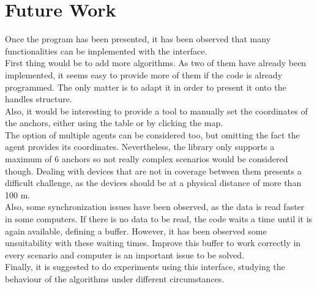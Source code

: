 \documentclass[a4paper, 21pt]{article} %
\begin{document}
\section{Future Work}
Once the program has been presented, it has been observed that many functionalities can be implemented with the interface.\\

First thing would be to add more algorithms. As two of them have already been implemented, it seems easy to provide more of them if the code is already programmed. The only matter is to adapt it in order to present it onto the handles structure.\\

Also, it would be interesting to provide a tool to manually set the coordinates of the anchors, either using the table or by clicking the map.\\

The option of multiple agents can be considered too, but omitting the fact the agent provides its coordinates. Nevertheless, the library only supports a maximum of 6 anchors so not really complex scenarios would be considered though. Dealing with devices that are not in coverage between them presents a difficult challenge, as the devices should be at a physical distance of more than 100 m.\\

Also, some synchronization issues have been observed, as the data is read faster in some computers. If there is no data to be read, the code waits a time until it is again available, defining a buffer. However, it has been observed some unsuitability with these waiting times. Improve this buffer to work correctly in every scenario and computer is an important issue to be solved.\\

Finally, it is suggested to do experiments using this interface, studying the behaviour of the algorithms under different circumstances.






\end{document}
